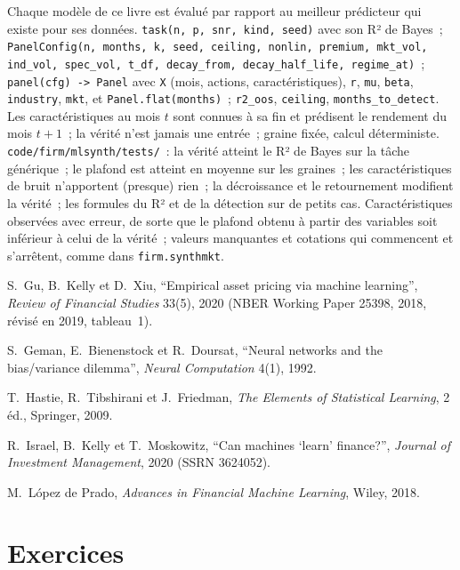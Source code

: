 \begin{build}
 Chaque modèle de ce livre est évalué par rapport au meilleur prédicteur qui existe pour ses données.
 \texttt{task(n, p, snr, kind, seed)} avec son R² de Bayes~;
\texttt{PanelConfig(n, months, k, seed, ceiling, nonlin, premium, mkt\_vol, ind\_vol, spec\_vol, t\_df, decay\_from, decay\_half\_life, regime\_at)}~;
\texttt{panel(cfg) -> Panel} avec \texttt{X} (mois, actions, caractéristiques), \texttt{r}, \texttt{mu},
\texttt{beta}, \texttt{industry}, \texttt{mkt}, et \texttt{Panel.flat(months)}~; \texttt{r2\_oos},
\texttt{ceiling}, \texttt{months\_to\_detect}.
 Les caractéristiques au mois $t$ sont connues à sa fin et prédisent le rendement du mois $t+1$~; la vérité n'est
jamais une entrée~; graine fixée, calcul déterministe.
 \texttt{code/firm/mlsynth/tests/}~: la vérité atteint le R² de Bayes sur la tâche générique~; le
plafond est atteint en moyenne sur les graines~; les caractéristiques de bruit n'apportent (presque) rien~; la décroissance et le retournement modifient la
vérité~; les formules du R² et de la détection sur de petits cas.
 Caractéristiques observées avec erreur, de sorte que le plafond obtenu à partir des variables soit inférieur à celui de la vérité~;
valeurs manquantes et cotations qui commencent et s'arrêtent, comme dans \texttt{firm.synthmkt}.
\end{build}

\begin{omsources}
\item S.~Gu, B.~Kelly et D.~Xiu, ``Empirical asset pricing via machine learning'', \emph{Review of Financial Studies}
33(5), 2020 (NBER Working Paper 25398, 2018, révisé en 2019, tableau~1).
\item S.~Geman, E.~Bienenstock et R.~Doursat, ``Neural networks and the bias/variance dilemma'', \emph{Neural
Computation} 4(1), 1992.
\item T.~Hastie, R.~Tibshirani et J.~Friedman, \emph{The Elements of Statistical Learning}, 2 éd., Springer, 2009.
\item R.~Israel, B.~Kelly et T.~Moskowitz, ``Can machines `learn' finance?'', \emph{Journal of Investment Management},
2020 (SSRN 3624052).
\item M.~López de Prado, \emph{Advances in Financial Machine Learning}, Wiley, 2018.
\end{omsources}

\section{Exercices}

